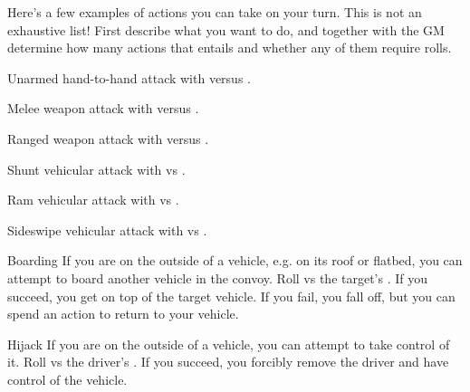 
Here's a few examples of actions you can take on your turn. This is not an exhaustive list! First describe what you want to do, and together with the GM determine how many actions that entails and whether any of them require rolls.

\begin{describe}{Unarmed hand-to-hand}
  attack with  versus .
\end{describe}

\begin{describe}{Melee weapon}
  attack with  versus .
\end{describe}

\begin{describe}{Ranged weapon}
  attack with  versus .
\end{describe}

\hr

\begin{describe}{Shunt}
  vehicular attack with  vs .
\end{describe}

\begin{describe}{Ram}
  vehicular attack with  vs .
\end{describe}

\begin{describe}{Sideswipe}
  vehicular attack with  vs .
\end{describe}

\hr

\begin{describe}{Boarding}
  If you are on the outside of a vehicle, e.g. on its roof or flatbed, you can attempt to board another vehicle in the convoy. Roll  vs the target's . If you succeed, you get on top of the target vehicle. If you fail, you fall off, but you can spend an action to return to your vehicle.
\end{describe}

\begin{describe}{Hijack}
  If you are on the outside of a vehicle, you can attempt to take control of it. Roll  vs the driver's . If you succeed, you forcibly remove the driver and have control of the vehicle.
\end{describe}

